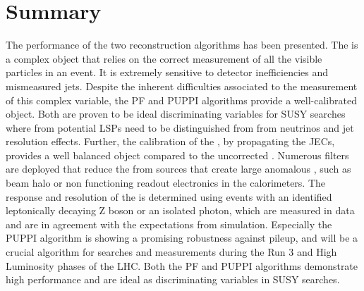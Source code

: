 \section{Summary}
\noindent\justify
The performance of the two \ptmiss reconstruction algorithms has been presented. 
The \ptmiss is a complex object that relies on the correct measurement of all the visible particles in an event. 
It is extremely sensitive to detector inefficiencies and mismeasured jets. 
Despite the inherent difficulties associated to the measurement of this complex variable, the PF and PUPPI algorithms provide a well-calibrated \ptmiss object.
Both are proven to be ideal discriminating variables for SUSY searches where \ptmiss from potential LSPs need to be distinguished from \ptmiss from neutrinos and jet resolution effects. 
Further, the calibration of the \ptmiss, by propagating the JECs, provides a well balanced object compared to the uncorrected \ptmiss. 
Numerous \ptmiss filters are deployed that reduce the \ptmiss from sources that create large anomalous \ptmiss, such as beam halo or non functioning readout electronics in the calorimeters. 
The response and resolution of the \ptmiss is determined using events with an identified leptonically decaying Z boson or an isolated photon, which are measured in data and are in agreement with the expectations from simulation. 
Especially the PUPPI \ptmiss algorithm is showing a promising robustness against pileup, and will be a crucial algorithm for searches and measurements during the Run 3 and High Luminosity phases of the LHC. 
Both the PF and PUPPI \ptmiss algorithms demonstrate high performance and are ideal as discriminating variables in SUSY searches.  
\clearpage
